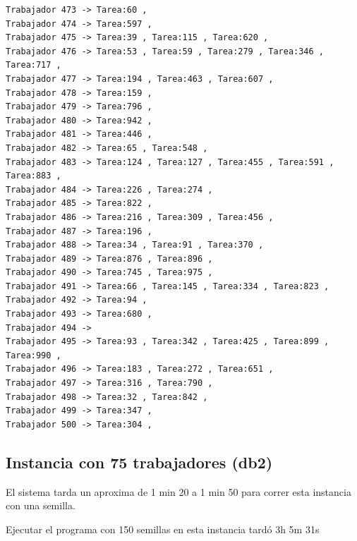 \documentclass{article}
\begin{document}
\begin{lstlisting}
Trabajador 473 -> Tarea:60 , 
Trabajador 474 -> Tarea:597 , 
Trabajador 475 -> Tarea:39 , Tarea:115 , Tarea:620 , 
Trabajador 476 -> Tarea:53 , Tarea:59 , Tarea:279 , Tarea:346 , Tarea:717 , 
Trabajador 477 -> Tarea:194 , Tarea:463 , Tarea:607 , 
Trabajador 478 -> Tarea:159 , 
Trabajador 479 -> Tarea:796 , 
Trabajador 480 -> Tarea:942 , 
Trabajador 481 -> Tarea:446 , 
Trabajador 482 -> Tarea:65 , Tarea:548 , 
Trabajador 483 -> Tarea:124 , Tarea:127 , Tarea:455 , Tarea:591 , Tarea:883 , 
Trabajador 484 -> Tarea:226 , Tarea:274 , 
Trabajador 485 -> Tarea:822 , 
Trabajador 486 -> Tarea:216 , Tarea:309 , Tarea:456 , 
Trabajador 487 -> Tarea:196 , 
Trabajador 488 -> Tarea:34 , Tarea:91 , Tarea:370 , 
Trabajador 489 -> Tarea:876 , Tarea:896 , 
Trabajador 490 -> Tarea:745 , Tarea:975 , 
Trabajador 491 -> Tarea:66 , Tarea:145 , Tarea:334 , Tarea:823 , 
Trabajador 492 -> Tarea:94 , 
Trabajador 493 -> Tarea:680 , 
Trabajador 494 -> 
Trabajador 495 -> Tarea:93 , Tarea:342 , Tarea:425 , Tarea:899 , Tarea:990 , 
Trabajador 496 -> Tarea:183 , Tarea:272 , Tarea:651 , 
Trabajador 497 -> Tarea:316 , Tarea:790 , 
Trabajador 498 -> Tarea:32 , Tarea:842 , 
Trabajador 499 -> Tarea:347 , 
Trabajador 500 -> Tarea:304 , 
\end{lstlisting}


\subsection{Instancia con 75 trabajadores (db2)}
El sistema tarda un aproxima de 1 min 20 a 1 min 50 para correr esta instancia con una semilla.

Ejecutar el programa con 150 semillas en esta instancia tardó 3h 5m 31s
\end{document}
